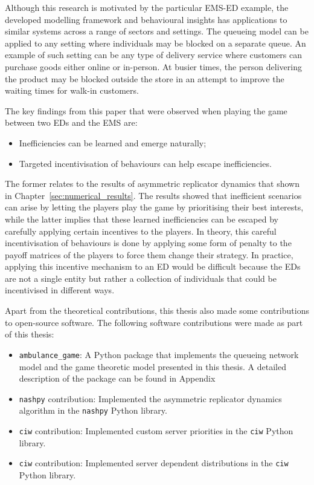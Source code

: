Although this research is motivated by the particular EMS-ED example, the
developed modelling framework and behavioural insights has applications to
similar systems across a range of sectors and settings.
The queueing model can be applied to any setting where individuals may be
blocked on a separate queue.
An example of such setting can be any type of delivery service where customers
can purchase goods either online or in-person.
At busier times, the person delivering the product may be blocked outside the
store in an attempt to improve the waiting times for walk-in customers.


The key findings from this paper that were observed when playing the game
between two EDs and the EMS are:

\begin{itemize}
    \item Inefficiencies can be learned and emerge naturally;
    \item Targeted incentivisation of behaviours can help escape inefficiencies.
\end{itemize}

The former relates to the results of asymmetric replicator dynamics that shown
in Chapter~\ref{sec:numerical_results}.
The results showed that inefficient scenarios can arise by letting the players
play the game by prioritising their best interests, while the latter
implies that these learned inefficiencies can be escaped by carefully applying
certain incentives to the players.
In theory, this careful incentivisation of behaviours is done by applying some
form of penalty to the payoff matrices of the players to force them change
their strategy.
In practice, applying this incentive mechanism to an ED would be difficult
because the EDs are not a single entity but rather a collection of individuals
that could be incentivised in different ways.


Apart from the theoretical contributions, this thesis also made some
contributions to open-source software.
The following software contributions were made as part of this thesis:

\begin{itemize}
    \item \texttt{ambulance\_game}: A Python package that implements the
    queueing network model and the game theoretic model presented in this
    thesis.
    A detailed description of the package can be found in
    Appendix %
    \item \texttt{nashpy} contribution: Implemented the asymmetric replicator
    dynamics algorithm in the \texttt{nashpy} Python library.
    \item \texttt{ciw} contribution: Implemented custom server priorities in
    the \texttt{ciw} Python library.
    \item \texttt{ciw} contribution: Implemented server dependent distributions
    in the \texttt{ciw} Python library.
\end{itemize}




